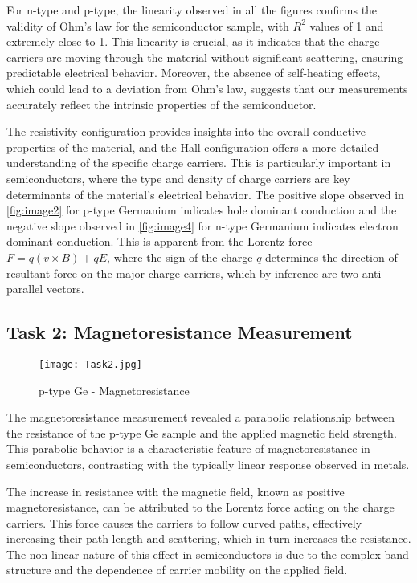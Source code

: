 \documentclass[11pt]{article}
\begin{document}
	For  n-type and p-type, the linearity observed in all the figures confirms the validity of Ohm's law for the semiconductor sample, with $R^2$ values of 1 and extremely close to 1. This linearity is crucial, as it indicates that the charge carriers are moving through the material without significant scattering, ensuring predictable electrical behavior. Moreover, the absence of self-heating effects, which could lead to a deviation from Ohm's law, suggests that our measurements accurately reflect the intrinsic properties of the semiconductor.
	
	The resistivity configuration provides insights into the overall conductive properties of the material, and the Hall configuration offers a more detailed understanding of the specific charge carriers. This is particularly important in semiconductors, where the type and density of charge carriers are key determinants of the material's electrical behavior. The positive slope observed in \ref{fig:image2} for p-type Germanium indicates hole dominant conduction and the negative slope observed in \ref{fig:image4} for n-type Germanium indicates electron dominant conduction. This is apparent from the Lorentz force $F = q(v \times B) + qE$, where the sign of the charge $q$ determines the direction of resultant force on the major charge carriers, which by inference are two anti-parallel vectors.
	
\clearpage	
	
	\subsection{Task 2: Magnetoresistance Measurement}
	
	\begin{figure}[htbp]
		\centering
		\caption{p-type Ge - Magnetoresistance}
		\texttt{[image: Task2.jpg]}
		\label{fig:image5}
	\end{figure}
	
	The magnetoresistance measurement revealed a parabolic relationship between the resistance of the p-type Ge sample and the applied magnetic field strength. This parabolic behavior is a characteristic feature of magnetoresistance in semiconductors, contrasting with the typically linear response observed in metals.
	
	The increase in resistance with the magnetic field, known as positive magnetoresistance, can be attributed to the Lorentz force acting on the charge carriers. This force causes the carriers to follow curved paths, effectively increasing their path length and scattering, which in turn increases the resistance. The non-linear nature of this effect in semiconductors is due to the complex band structure and the dependence of carrier mobility on the applied field.
	
\end{document}
